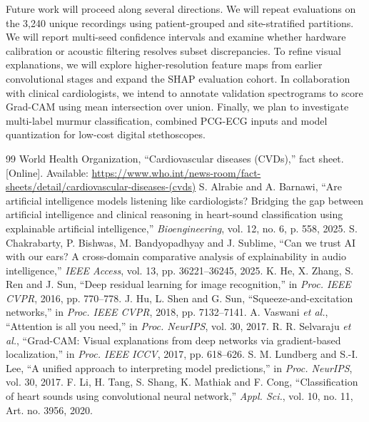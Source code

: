 \documentclass[conference]{IEEEtran}
\begin{document}
Future work will proceed along several directions. We will repeat evaluations on the 3,240 unique recordings using patient-grouped and site-stratified partitions. We will report multi-seed confidence intervals and examine whether hardware calibration or acoustic filtering resolves subset discrepancies. To refine visual explanations, we will explore higher-resolution feature maps from earlier convolutional stages and expand the SHAP evaluation cohort. In collaboration with clinical cardiologists, we intend to annotate validation spectrograms to score Grad-CAM using mean intersection over union. Finally, we plan to investigate multi-label murmur classification, combined PCG-ECG inputs and model quantization for low-cost digital stethoscopes.

\begin{thebibliography}{99}
 World Health Organization, ``Cardiovascular diseases (CVDs),'' fact sheet. [Online]. Available: \url{https://www.who.int/news-room/fact-sheets/detail/cardiovascular-diseases-(cvds)}
 S. Alrabie and A. Barnawi, ``Are artificial intelligence models listening like cardiologists? Bridging the gap between artificial intelligence and clinical reasoning in heart-sound classification using explainable artificial intelligence,'' \textit{Bioengineering}, vol. 12, no. 6, p. 558, 2025.
 S. Chakrabarty, P. Bishwas, M. Bandyopadhyay and J. Sublime, ``Can we trust AI with our ears? A cross-domain comparative analysis of explainability in audio intelligence,'' \textit{IEEE Access}, vol. 13, pp. 36221--36245, 2025.
 K. He, X. Zhang, S. Ren and J. Sun, ``Deep residual learning for image recognition,'' in \textit{Proc. IEEE CVPR}, 2016, pp. 770--778.
 J. Hu, L. Shen and G. Sun, ``Squeeze-and-excitation networks,'' in \textit{Proc. IEEE CVPR}, 2018, pp. 7132--7141.
 A. Vaswani \textit{et al.}, ``Attention is all you need,'' in \textit{Proc. NeurIPS}, vol. 30, 2017.
 R. R. Selvaraju \textit{et al.}, ``Grad-CAM: Visual explanations from deep networks via gradient-based localization,'' in \textit{Proc. IEEE ICCV}, 2017, pp. 618--626.
 S. M. Lundberg and S.-I. Lee, ``A unified approach to interpreting model predictions,'' in \textit{Proc. NeurIPS}, vol. 30, 2017.
 F. Li, H. Tang, S. Shang, K. Mathiak and F. Cong, ``Classification of heart sounds using convolutional neural network,'' \textit{Appl. Sci.}, vol. 10, no. 11, Art. no. 3956, 2020.

\end{thebibliography}
\end{document}
